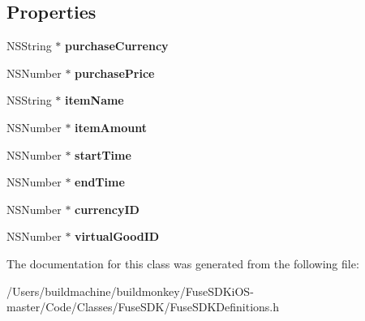 \subsection*{Properties}
\begin{DoxyCompactItemize}
\item 
\hypertarget{interface_fuse_virtual_goods_offer_object_a60cbcab572527ebc765b0fcbba5e1bdc}{}N\+S\+String $\ast$ {\bfseries purchase\+Currency}\label{interface_fuse_virtual_goods_offer_object_a60cbcab572527ebc765b0fcbba5e1bdc}

\item 
\hypertarget{interface_fuse_virtual_goods_offer_object_a860943b511058dbaace8344976c6000f}{}N\+S\+Number $\ast$ {\bfseries purchase\+Price}\label{interface_fuse_virtual_goods_offer_object_a860943b511058dbaace8344976c6000f}

\item 
\hypertarget{interface_fuse_virtual_goods_offer_object_afc44eae0ea1010ef7b02515dfc156e68}{}N\+S\+String $\ast$ {\bfseries item\+Name}\label{interface_fuse_virtual_goods_offer_object_afc44eae0ea1010ef7b02515dfc156e68}

\item 
\hypertarget{interface_fuse_virtual_goods_offer_object_a3eb537b8ee870de5085c035c1de25a31}{}N\+S\+Number $\ast$ {\bfseries item\+Amount}\label{interface_fuse_virtual_goods_offer_object_a3eb537b8ee870de5085c035c1de25a31}

\item 
\hypertarget{interface_fuse_virtual_goods_offer_object_a498e28eb1d66c5f180a7c5b1821fa7de}{}N\+S\+Number $\ast$ {\bfseries start\+Time}\label{interface_fuse_virtual_goods_offer_object_a498e28eb1d66c5f180a7c5b1821fa7de}

\item 
\hypertarget{interface_fuse_virtual_goods_offer_object_a25d920dd9d75005ff4a80ea4cf1b8d53}{}N\+S\+Number $\ast$ {\bfseries end\+Time}\label{interface_fuse_virtual_goods_offer_object_a25d920dd9d75005ff4a80ea4cf1b8d53}

\item 
\hypertarget{interface_fuse_virtual_goods_offer_object_a1fd418f96df073f01dee40a326293059}{}N\+S\+Number $\ast$ {\bfseries currency\+I\+D}\label{interface_fuse_virtual_goods_offer_object_a1fd418f96df073f01dee40a326293059}

\item 
\hypertarget{interface_fuse_virtual_goods_offer_object_ad8734bced746bbf3996998eaa788121f}{}N\+S\+Number $\ast$ {\bfseries virtual\+Good\+I\+D}\label{interface_fuse_virtual_goods_offer_object_ad8734bced746bbf3996998eaa788121f}

\end{DoxyCompactItemize}


The documentation for this class was generated from the following file\+:\begin{DoxyCompactItemize}
\item 
/\+Users/buildmachine/buildmonkey/\+Fuse\+S\+D\+Ki\+O\+S-\/master/\+Code/\+Classes/\+Fuse\+S\+D\+K/Fuse\+S\+D\+K\+Definitions.\+h\end{DoxyCompactItemize}
